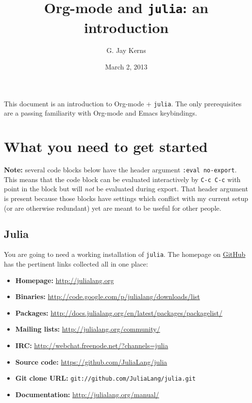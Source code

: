 \documentclass[11pt]{article}
\author{G. Jay Kerns}
\date{March 2, 2013}
\title{Org-mode and \texttt{julia}: an introduction}
\begin{document}
\maketitle
\tableofcontents

\newpage

This document is an introduction to Org-mode + \texttt{julia}. The only
prerequisites are a passing familiarity with Org-mode and Emacs
keybindings.

\section[What you need to get started]{What you need to get started}
\label{sec-1}

\textbf{Note:} several code blocks below have the header argument \texttt{:eval
  no-export}.  This means that the code block can be evaluated
  interactively by \texttt{C-c C-c} with point in the block but will \emph{not} be
  evaluated during export.  That header argument is present because
  those blocks have settings which conflict with my current setup (or
  are otherwise redundant) yet are meant to be useful for other
  people.

\subsection[Julia]{Julia}
\label{sec-1-1}

You are going to need a working installation of \texttt{julia}.  The homepage
on \href{https://github.com/JuliaLang/julia}{GitHub} has the pertinent links collected all in one place:

\begin{itemize}
\item \textbf{Homepage:} \url{http://julialang.org}
\item \textbf{Binaries:} \url{http://code.google.com/p/julialang/downloads/list}
\item \textbf{Packages:} \url{http://docs.julialang.org/en/latest/packages/packagelist/}
\item \textbf{Mailing lists:} \url{http://julialang.org/community/}
\item \textbf{IRC:} \url{http://webchat.freenode.net/?channels=julia}
\item \textbf{Source code:} \url{https://github.com/JuliaLang/julia}
\item \textbf{Git clone URL:} \texttt{git://github.com/JuliaLang/julia.git}
\item \textbf{Documentation:} \url{http://julialang.org/manual/}
\end{itemize}
\end{document}
